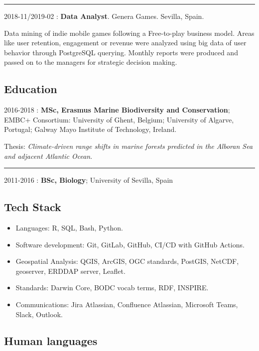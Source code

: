 \documentclass[
  16,
]{article}
\providecommand{\tightlist}{%
  \setlength{\itemsep}{0pt}\setlength{\parskip}{0pt}}\usepackage{longtable,booktabs,array}
\begin{document}
\begin{center}\rule{0.5\linewidth}{0.5pt}\end{center}

2018-11/2019-02 : \textbf{Data Analyst}. Genera Games. Sevilla, Spain.

Data mining of indie mobile games following a Free-to-play business
model. Areas like user retention, engagement or revenue were analyzed
using big data of user behavior through PostgreSQL querying. Monthly
reports were produced and passed on to the managers for strategic
decision making.

\hypertarget{education}{%
\subsection{Education}\label{education}}

2016-2018 : \textbf{MSc, Erasmus Marine Biodiversity and Conservation};
EMBC+ Consortium: University of Ghent, Belgium; University of Algarve,
Portugal; Galway Mayo Institute of Technology, Ireland.

Thesis: \emph{Climate-driven range shifts in marine forests predicted in
the Alboran Sea and adjacent Atlantic Ocean}.

\begin{center}\rule{0.5\linewidth}{0.5pt}\end{center}

2011-2016 : \textbf{BSc, Biology}; University of Sevilla, Spain

\hypertarget{tech-stack}{%
\subsection{Tech Stack}\label{tech-stack}}

\begin{itemize}
\tightlist
\item
  Languages: R, SQL, Bash, Python.
\item
  Software development: Git, GitLab, GitHub, CI/CD with GitHub Actions.
\item
  Geospatial Analysis: QGIS, ArcGIS, OGC standards, PostGIS, NetCDF,
  geoserver, ERDDAP server, Leaflet.
\item
  Standards: Darwin Core, BODC vocab terms, RDF, INSPIRE.
\item
  Communications: Jira Atlassian, Confluence Atlassian, Microsoft Teams,
  Slack, Outlook.
\end{itemize}

\hypertarget{human-languages}{%
\subsection{Human languages}\label{human-languages}}
\end{document}

